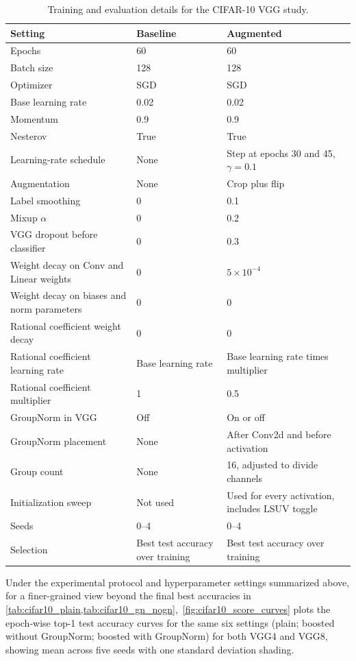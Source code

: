 \documentclass{article}
\theoremstyle{plain}
\theoremstyle{definition}
\theoremstyle{remark}
\begin{document}
\begin{table}
\centering
\caption{Training and evaluation details for the CIFAR-10 VGG study.}
\label{tab:cifar10_hparams}
\footnotesize
\renewcommand{\arraystretch}{1.10}
\begin{tabular}{@{}p{}p{}p{}@{}}
\toprule
Setting & Baseline & Augmented \\
\midrule
Epochs & 60 & 60 \\
Batch size & 128 & 128 \\
Optimizer & SGD & SGD \\
Base learning rate & 0.02 & 0.02 \\
Momentum & 0.9 & 0.9 \\
Nesterov & True & True \\
Learning-rate schedule & None & Step at epochs 30 and 45, $\gamma=0.1$ \\
\addlinespace
Augmentation & None & Crop plus flip \\
Label smoothing & 0 & 0.1 \\
Mixup $\alpha$ & 0 & 0.2 \\
VGG dropout before classifier & 0 & 0.3 \\
\addlinespace
Weight decay on Conv and Linear weights & 0 & $5\times 10^{-4}$ \\
Weight decay on biases and norm parameters & 0 & 0 \\
Rational coefficient weight decay & 0 & 0 \\
Rational coefficient learning rate & Base learning rate & Base learning rate times multiplier \\
Rational coefficient multiplier & 1 & 0.5 \\
\addlinespace
GroupNorm in VGG & Off & On or off \\
GroupNorm placement & None & After Conv2d and before activation \\
Group count & None & 16, adjusted to divide channels \\
\addlinespace
Initialization sweep & Not used & Used for every activation, includes LSUV toggle \\
Seeds & 0--4 & 0--4 \\
Selection & Best test accuracy over training & Best test accuracy over training \\
\bottomrule
\end{tabular}
\end{table}

Under the experimental protocol and hyperparameter settings summarized above, for a finer-grained view beyond the final best accuracies in \cref{tab:cifar10_plain,tab:cifar10_gn_nogn},~\cref{fig:cifar10_score_curves} plots the epoch-wise top-1 test accuracy curves for the same six settings (plain; boosted without GroupNorm; boosted with GroupNorm) for both VGG4 and VGG8, showing mean across five seeds with one standard deviation shading.
\end{document}
